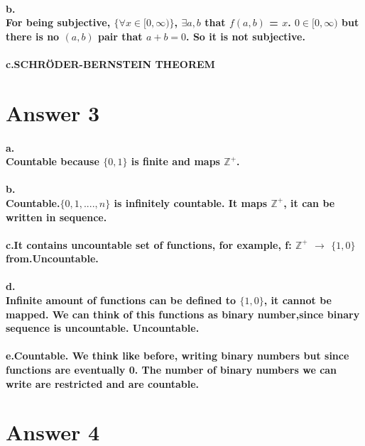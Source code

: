 \documentclass[11pt]{article}
\begin{document}
\paragraph{b.\\For being subjective, $\{ \forall x \in [0, \infty) \}$, $\exists a,b$ that $f(a,b)$ = $ x$. $0 \in [0, \infty)$ but there is no $(a,b)$ pair that $a+b = 0$. So it is not subjective.}
\paragraph{c.SCHRÖDER-BERNSTEIN THEOREM}

\section*{Answer 3}
\paragraph{a.\\ Countable because $\{0, 1\}$ is finite and maps $\mathbb{Z}^+$. }
\paragraph{b.\\ Countable.$\{0, 1, ...., n\}$ is infinitely countable. It maps $\mathbb{Z}^+$, it can be written in sequence. }
\paragraph{c.It contains uncountable set of functions, for example, f: $\mathbb{Z}^+$ $\rightarrow$ $\{1,0\}$ from.Uncountable.}
\paragraph{d.\\ Infinite amount of functions can be defined to $\{1,0\}$, it cannot be mapped. We can think of this functions as binary number,since binary  sequence is uncountable. Uncountable.}
\paragraph{e.Countable. We think like before, writing binary numbers but since functions are eventually 0. The number of binary numbers we can write are restricted and are countable.}

\section*{Answer 4}
\end{document}
